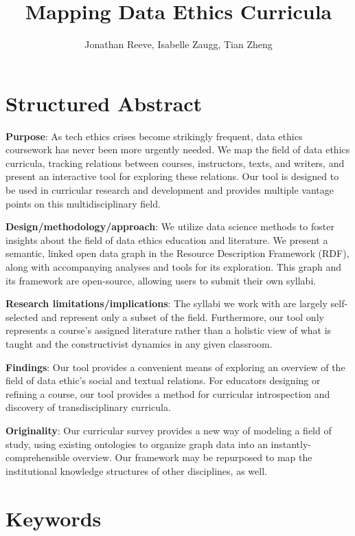 \documentclass[
]{article}
\title{Mapping Data Ethics Curricula}
\author{Jonathan Reeve, Isabelle Zaugg, Tian Zheng}
\date{}
\begin{document}
\maketitle

\hypertarget{structured-abstract}{%
\section{Structured Abstract}\label{structured-abstract}}

\textbf{Purpose}: As tech ethics crises become strikingly frequent, data
ethics coursework has never been more urgently needed. We map the field
of data ethics curricula, tracking relations between courses,
instructors, texts, and writers, and present an interactive tool for
exploring these relations. Our tool is designed to be used in curricular
research and development and provides multiple vantage points on this
multidisciplinary field.

\textbf{Design/methodology/approach}: We utilize data science methods to
foster insights about the field of data ethics education and literature.
We present a semantic, linked open data graph in the Resource
Description Framework (RDF), along with accompanying analyses and tools
for its exploration. This graph and its framework are open-source,
allowing users to submit their own syllabi.

\textbf{Research limitations/implications}: The syllabi we work with are
largely self-selected and represent only a subset of the field.
Furthermore, our tool only represents a course's assigned literature
rather than a holistic view of what is taught and the constructivist
dynamics in any given classroom.

\textbf{Findings}: Our tool provides a convenient means of exploring an
overview of the field of data ethic's social and textual relations. For
educators designing or refining a course, our tool provides a method for
curricular introspection and discovery of transdisciplinary curricula.

\textbf{Originality}: Our curricular survey provides a new way of
modeling a field of study, using existing ontologies to organize graph
data into an instantly-comprehensible overview. Our framework may be
repurposed to map the institutional knowledge structures of other
disciplines, as well.

\hypertarget{keywords}{%
\section{Keywords}\label{keywords}}
\end{document}
